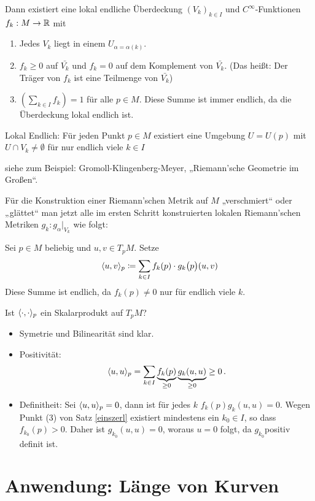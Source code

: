 \documentclass[a4paper,twoside,DIV15,BCOR12mm]{scrbook}
\renewcommand{\da}{\coloneqq}
\begin{document}
\begin{beweis}
\begin{satz}
Dann existiert eine lokal endliche  Überdeckung $(V_k)_{k\in I}$ und $C^\infty$-Funktionen $f_k: M \to \mathbb{R}$ mit
\begin{enumerate}
\item Jedes $V_k$ liegt in einem $U_{\alpha=\alpha(k)}$.
\item $f_k\ge 0$ auf $\bar{V_k}$ und $f_k = 0$ auf dem Komplement von $\bar{V_k}$. (Das heißt: Der Träger von $f_k$ ist eine Teilmenge von $\bar{V_k}$)
\item $( \sum_{k\in I} f_k ) = 1$ für alle $p\in M$. Diese Summe ist immer endlich, da die Überdeckung lokal endlich ist. 
\end{enumerate}
\end{satz}
Lokal Endlich: {Für jeden Punkt $p\in M$ existiert eine Umgebung $U=U(p)$ mit $U\cap V_k \ne \emptyset$ für nur endlich viele $k\in I$}
\begin{beweis}
siehe zum Beispiel: Gromoll-Klingenberg-Meyer, „Riemann’sche Geometrie im Großen“.
\end{beweis}

Für die Konstruktion einer Riemann’schen Metrik auf $M$ „verschmiert“ oder „glättet“ man jetzt alle im ersten Schritt konstruierten lokalen Riemann’schen Metriken $g_k : g_\alpha|_{V_k}$ wie folgt: 

Sei $p\in M$ beliebig und $u,v \in T_pM$. Setze 
\[
\ksp uv_p \da \sum_{k\in I} f_k(p) \cdot g_k\big(p\big) (u,v)
\]
Diese Summe ist endlich, da $f_k(p) \ne 0$ nur für endlich viele $k$.

Ist $\langle\cdot,\cdot\rangle_p$ ein Skalarprodukt auf $T_pM$? 
\begin{itemize}
\item Symetrie und Bilinearität sind klar.
\item Positivität:
\[ \langle u,u\rangle_p = \sum_{k\in I} \underbrace{f_k(p)}_{\ge 0} \underbrace{g_k(u,u)}_{\ge 0} \ge 0\,.\]
\item Definitheit: Sei $\langle u,u\rangle_p = 0$, dann ist für jedes $k$ $f_k(p) g_k(u,u) = 0$. Wegen Punkt (3) von Satz \ref{einszerl} existiert mindestens ein $k_0\in I$, so dass $f_{k_0}(p) > 0$. Daher ist $g_{k_0}(u,u) = 0$, woraus $u=0$ folgt, da $g_{k_0} $positiv definit ist.
\end{itemize}

\end{beweis}


\section[Erste Anwendung von Riemann’schen Metriken: Länge von Kurven]{Anwendung: Länge von Kurven}
\end{document}
